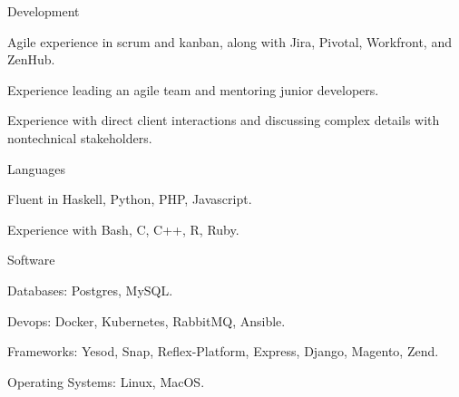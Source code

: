 \begin{cvskills}
  \cvskill
    {Development}
    {\begin{cvitems}
        \item Agile experience in scrum and kanban, along with Jira, Pivotal,
          Workfront, and ZenHub.
        \item Experience leading an agile team and mentoring junior developers.
        \item Experience with direct client interactions and
          discussing complex details with nontechnical stakeholders.
     \end{cvitems}}
  \cvskill
    {Languages}
    {\begin{cvitems}
        \item Fluent in Haskell, Python, PHP, Javascript.
        \item Experience with Bash, C, C++, R, Ruby.
     \end{cvitems}}
  \cvskill
    {Software}
    {\begin{cvitems}
        \item Databases: Postgres, MySQL.
        \item Devops: Docker, Kubernetes, RabbitMQ, Ansible.
        \item Frameworks: Yesod, Snap, Reflex-Platform, Express, Django, Magento, Zend.
        \item Operating Systems: Linux, MacOS.
     \end{cvitems}}
\end{cvskills}

